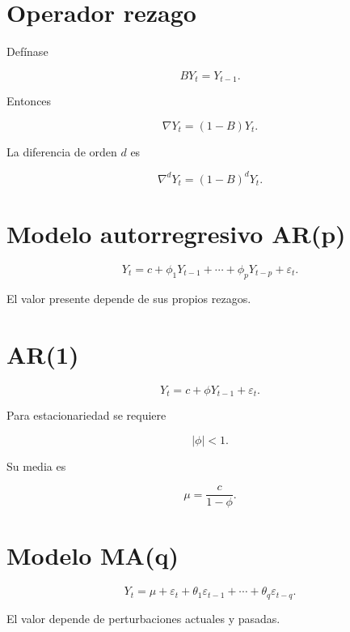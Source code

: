 \documentclass[
  spanish,
  10.5pt,
  letterpaper,
  DIV=11,
  numbers=noendperiod,
  oneside,
  open=any]{scrreprt}
\theoremstyle{definition}
\theoremstyle{definition}
\theoremstyle{plain}
\theoremstyle{remark}
\begin{document}
\section*{Operador rezago}\label{operador-rezago}


Defínase

\[
BY_t=Y_{t-1}.
\]

Entonces

\[
\nabla Y_t=(1-B)Y_t.
\]

La diferencia de orden \(d\) es

\[
\nabla^dY_t=(1-B)^dY_t.
\]

\section*{Modelo autorregresivo AR(p)}\label{modelo-autorregresivo-arp}


\[
Y_t
=
c+
\phi_1Y_{t-1}
+\cdots+
\phi_pY_{t-p}
+\varepsilon_t.
\]

El valor presente depende de sus propios rezagos.

\section*{AR(1)}\label{ar1}


\[
Y_t=c+\phi Y_{t-1}+\varepsilon_t.
\]

Para estacionariedad se requiere

\[
|\phi|<1.
\]

Su media es

\[
\mu=\frac{c}{1-\phi}.
\]

\section*{Modelo MA(q)}\label{modelo-maq}


\[
Y_t
=
\mu+
\varepsilon_t+
\theta_1\varepsilon_{t-1}
+\cdots+
\theta_q\varepsilon_{t-q}.
\]

El valor depende de perturbaciones actuales y pasadas.
\end{document}
